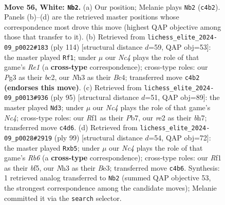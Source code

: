 \documentclass[11pt]{article}
\begin{document}
\clearpage

\begin{figure}[p]\centering
\begin{subfigure}{0.46\textwidth}\centering
\resizebox{\linewidth}{!}{%
\newchessgame
\chessboard[
  setfen={8/6k1/1pb5/p1p5/2N5/K1Pr2PN/4rp1P/5R2 w - - 8 56},
  showmover=false,
  pgfstyle=straightmove, color=movearrow, markmove={c4-b2}
]}
\caption{}
\end{subfigure}\hfill
\begin{subfigure}{0.46\textwidth}\centering
\resizebox{\linewidth}{!}{%
\newchessgame
\chessboard[
  setfen={8/6k1/p7/P2Nb3/2B2p2/2P1pP1p/2br4/4R1K1 w - - 2 58},
  showmover=false,
  pgfstyle=straightmove, color=movearrow, markmove={e1-f1}
]}
\caption{}
\end{subfigure}
\\[4pt]
\begin{subfigure}{0.46\textwidth}\centering
\resizebox{\linewidth}{!}{%
\newchessgame
\chessboard[
  setfen={8/1p5B/2p2k2/p1n3pR/P3P3/1Pr4P/6P1/6K1 b - - 3 48},
  showmover=false,
  pgfstyle=straightmove, color=movearrow, markmove={c5-d3}
]}
\caption{}
\end{subfigure}\hfill
\begin{subfigure}{0.46\textwidth}\centering
\resizebox{\linewidth}{!}{%
\newchessgame
\chessboard[
  setfen={8/1pR1p1k1/5n2/1P1P1B2/4p2P/1r2b1P1/6K1/3R4 b - - 1 50},
  showmover=false,
  pgfstyle=straightmove, color=movearrow, markmove={b3-b5}
]}
\caption{}
\end{subfigure}
\caption{\textbf{Move 56, White: \texttt{Nb2}.} (a) Our position; Melanie plays \texttt{Nb2} (\texttt{c4b2}). Panels (b)--(d) are the retrieved master positions whose correspondence most drove this move (highest QAP objective among those that transfer to it). (b) Retrieved from \texttt{lichess\_elite\_2024-09\_p0022\#183} (ply 114) [structural distance $d$=59, QAP obj=53]: the master played \texttt{Rf1}; under $\mu$ our \emph{Nc4} plays the role of that game's \emph{Re1} (a \textbf{cross-type} correspondence); cross-type roles: our \emph{P}g3 as their \emph{b}c2, our \emph{N}h3 as their \emph{B}c4; transferred move \texttt{c4b2} \textbf{(endorses this move)}. (c) Retrieved from \texttt{lichess\_elite\_2024-09\_p0013\#936} (ply 95) [structural distance $d$=51, QAP obj=89]: the master played \texttt{Nd3}; under $\mu$ our \emph{Nc4} plays the role of that game's \emph{Nc4}; cross-type roles: our \emph{R}f1 as their \emph{P}b7, our \emph{r}e2 as their \emph{b}h7; transferred move \texttt{c4d6}. (d) Retrieved from \texttt{lichess\_elite\_2024-09\_p0028\#2919} (ply 99) [structural distance $d$=54, QAP obj=72]: the master played \texttt{Rxb5}; under $\mu$ our \emph{Nc4} plays the role of that game's \emph{Rb6} (a \textbf{cross-type} correspondence); cross-type roles: our \emph{R}f1 as their \emph{b}f5, our \emph{N}h3 as their \emph{B}e3; transferred move \texttt{c4b6}. Synthesis: 1 retrieved analog transferred to \texttt{Nb2} (summed QAP objective 53, the strongest correspondence among the candidate moves); Melanie committed it via the \texttt{search} selector.}
\label{fig:thought-m110}
\end{figure}
\end{document}

